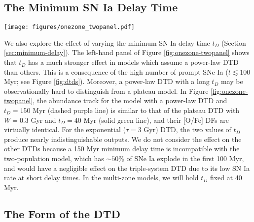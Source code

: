 \documentclass[twocolumn,twocolappendix]{aastex631}
\begin{document}
\subsection{The Minimum SN Ia Delay Time}
\label{sec:onezone-minimum-delay}

\begin{figure*}
    \centering
    \texttt{[image: figures/onezone\_twopanel.pdf]}
    \caption{\textit{Left:} Comparison of one-zone models with different combinations of minimum delay time $t_D$ and DTD shape.
    The layout is similar to Figure \ref{fig:onezone-threepanel}. For visual clarity, we assume a mass-loading factor $\eta=1$ for the exponential DTD curves, which places the end-point of the abundance tracks at higher [Fe/H].
    \textit{Right:} Comparison of one-zone models with five different DTD models (see Figure \ref{fig:dtds}).
    }
    \label{fig:onezone-twopanel}
\end{figure*}

We also explore the effect of varying the minimum SN Ia delay time $t_D$ (Section \ref{sec:minimum-delay}).
The left-hand panel of Figure \ref{fig:onezone-twopanel} shows that $t_D$ has a much stronger effect in models which assume a power-law DTD than others. This is a consequence of the high number of prompt SNe Ia ($t\lesssim100$ Myr; see Figure \ref{fig:dtds}). Moreover, a power-law DTD with a long $t_D$ may be observationally hard to distinguish from a plateau model. In Figure \ref{fig:onezone-twopanel}, the abundance track for the model with a power-law DTD and $t_D=150$ Myr (dashed purple line) is similar to that of the plateau DTD with $W=0.3$ Gyr and $t_D=40$ Myr (solid green line), and their [O/Fe] DFs are virtually identical. For the exponential ($\tau=3$ Gyr) DTD, the two values of $t_D$ produce nearly indistinguishable outputs. We do not consider the effect on the other DTDs because a 150 Myr minimum delay time is incompatible with the two-population model, which has $\sim 50$\% of SNe Ia explode in the first 100 Myr, and would have a negligible effect on the triple-system DTD due to its low SN Ia rate at short delay times.
In the multi-zone models, we will hold $t_D$ fixed at 40 Myr.

\subsection{The Form of the DTD}
\label{sec:onezone-dtd-form}
\end{document}
